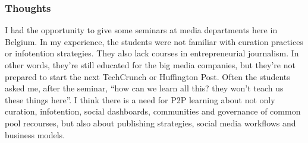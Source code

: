 \subsubsection{Thoughts}

I had the opportunity to give some seminars at media departments here in
Belgium. In my experience, the students were not familiar with curation
practices or infotention strategies. They also lack courses in
entrepreneurial journalism. In other words, they're still educated for
the big media companies, but they're not prepared to start the next
TechCrunch or Huffington Post. Often the students asked me, after the
seminar, ``how can we learn all this? they won't teach us these things
here''. I think there is a need for P2P learning about not only
curation, infotention, social dashboards, communities and governance of
common pool recourses, but also about publishing strategies, social
media workflows and business models.
